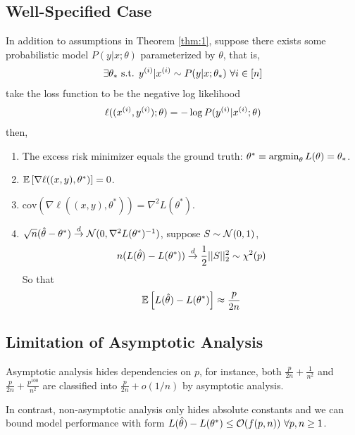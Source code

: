 \documentclass[11pt]{article}
\newcommand{\thetahat}[0]{\hat{\theta}}
\newcommand{\convd}[0]{\overset{d}{\rightarrow}}
\newcommand{\inv}[0]{^{-1}}
\newcommand{\cov}[0]{\text{cov}}
\newcommand{\suchthat}[0]{\text{ s.t. }}
\begin{document}
	\subsection{Well-Specified Case}
	\begin{theorem}
		In addition to assumptions in Theorem \ref{thm:1}, suppose there exists some probabilistic model $P(y|x; \theta)$ parameterized by $\theta$, that is,
		\begin{align}
			\exists \theta_* \suchthat y\upi |x\upi \sim P(y|x;\theta_*)\ \forall i \in [n] 
		\end{align}
		take the loss function to be the negative log likelihood
		\begin{align}
			\ell((x^{(i)}, y^{(i)}); \theta) = - \log P(y^{(i)} | x^{(i)}; \theta)
		\end{align}
		then,
		\begin{enumerate}[label=(\arabic*)]
			\item The excess risk minimizer equals the ground truth: $\theta^* \equiv \operatorname*{argmin}_{\theta} L(\theta) = \theta_*$.
			\item $\mathbb{E}\left[{\nabla \ell((x, y), \theta^*)}\right] = 0$.
			\item $\cov(\nabla \ell((x, y), \theta^*)) = \nabla^2 L(\theta^*)$.
			\item $\sqrt{n}(\thetahat - \theta^*) \convd \mc{N}(0, \nabla^2 L(\theta^*)\inv)$, suppose $S \sim \mathcal{{N}}(0, 1)$,
			\begin{align}
				n (L(\thetahat) - L(\theta^*)) \convd \frac{1}{2} \norm{S}_2^2 \sim \chi^2(p)
			\end{align}
			So that
			\begin{align}
				\expect{L(\thetahat) - L(\theta^*)} \approx \frac{p}{2n}
			\end{align}
		\end{enumerate}
	\end{theorem}
	
	\subsection{Limitation of Asymptotic Analysis}
	\par Asymptotic analysis hides dependencies on $p$, for instance, both $\frac{p}{2n} + \frac{1}{n^2}$ and $ \frac{p}{2n} + \frac{p^{100}}{n^2}$ are classified into $\frac{p}{2n} + o(1/n)$ by asymptotic analysis.

	In contrast, non-asymptotic analysis only hides absolute constants and we can bound model performance with form $L(\thetahat) - L(\theta^*) \leq \mc{O}(f(p, n))\ \forall p, n \geq 1$.
	
\end{document}
